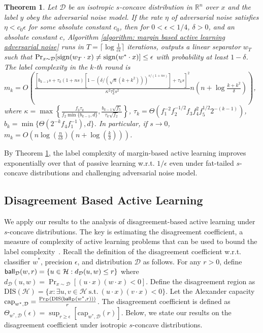 \documentclass[11pt]{article}
\newcommand{\cD}{\mathcal{D}}
\newcommand{\R}{\mathbb{R}}
\newcommand{\sign}{\textup{sign}}
\newcommand{\ball}{\textup{\textsf{ball}}}
\newtheorem{theorem}{Theorem}
\begin{document}
\begin{theorem}
\label{theorem: margin-based active learning adversarial noise}
Let $\cD$ be an isotropic $s$-concave distribution in $\R^n$ over $x$ and the label $y$ obey the adversarial noise model. If the rate $\eta$ of adversarial noise satisfies $\eta<c_0\epsilon$ for some absolute constant $c_0$, then for $0<\epsilon<1/4$, $\delta>0$, and an absolute constant $c$, Algorithm \ref{algorithm: margin based active learning adversarial noise} runs in $T=\lceil\log \frac{1}{c\epsilon}\rceil$ iterations, outputs a linear separator $w_T$ such that $\Pr_{x\sim \cD}[\sign(w_T\cdot x)\not=\sign(w^*\cdot x)]\le\epsilon$ with probability at least $1-\delta$. The label complexity in the $k$-th round is $m_k=O\left( \frac{[b_{k-1}s+\tau_k(1+ns)[1-(\delta/(\sqrt{n}(k+k^2)))^{s/(1+ns)}]+\tau_ks]^2}{\kappa^2\tau_k^2s^2}n\left(n+\log \frac{k+k^2}{\delta}\right)\right)$, where $\kappa=\max\left\{\frac{f_3\tau_k}{f_2\min\{b_{k-1},d\}},\frac{b_{k-1}\sqrt{f_5}}{\tau_k\sqrt{f_2}}\right\}$, $\tau_k=\Theta\left(f_1^{-2}f_2^{-1/2}f_3f_4^2f_5^{1/2}2^{-(k-1)}\right)$, $b_k=\min\{\Theta(2^{-k}f_4f_1^{-1}),d\}$. In particular, if $s\rightarrow 0$, $m_k=O\left(n\log(\frac{n}{\epsilon\delta})(n+\log(\frac{k}{\delta}))\right)$.
\end{theorem}


By Theorem \ref{theorem: margin-based active learning adversarial noise}, the label complexity of margin-based active learning improves exponentially over that of passive learning w.r.t. $1/\epsilon$ even under fat-tailed $s$-concave distributions and challenging adversarial noise model.


\subsection{Disagreement Based Active Learning}

We apply our results to the analysis of disagreement-based active learning under $s$-concave distributions. The key is estimating the disagreement coefficient, a measure of complexity of active learning problems that can be used to bound the label complexity~\cite{hanneke2007bound}. Recall the definition of the disagreement coefficient w.r.t. classifier $w^*$, precision $\epsilon$, and distribution $\mathcal{D}$ as follows. For any $r>0$, define $\ball_{\mathcal{D}}(w,r)=\{u\in\mathcal{H}:d_{\mathcal{D}}(u,w)\le r\}$ where $d_{\mathcal{D}}(u,w)=\Pr_{x\sim\mathcal{D}}[(u\cdot x)(w\cdot x)<0]$. Define the disagreement region as $\mbox{DIS}(\mathcal{H})=\{x:\exists u,v\in\mathcal{H}\ \mbox{s.t.}\ (u\cdot x)(v\cdot x)<0\}$. Let the Alexander capacity $\mbox{cap}_{w^*,\mathcal{D}}=\frac{\Pr_{\mathcal{D}}(\text{DIS}(\ball_{\mathcal{D}}(w^*,r)))}{r}$. The disagreement coefficient is defined as $\Theta_{w^*,\mathcal{D}}(\epsilon)=\sup_{r\ge\epsilon}[\text{cap}_{w^*,\mathcal{D}}(r)]$. Below, we state our results on the disagreement coefficient under isotropic $s$-concave distributions.
\end{document}
